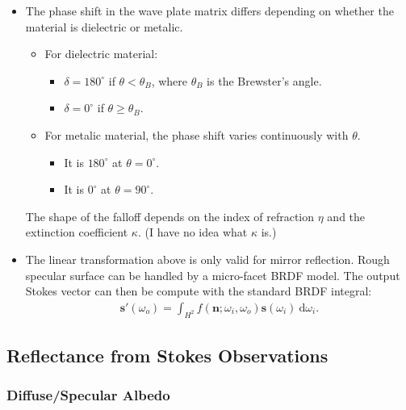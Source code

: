 \documentclass[10pt]{article}
\newcommand{\dee}{\mathrm{d}}
\newcommand{\ve}[1]{\mathbf{#1}}
\begin{document}
\begin{itemize}
        \item The phase shift in the wave plate matrix differs depending on whether the material is dielectric or metalic.
        \begin{itemize}
          \item For dielectric material:
          \begin{itemize}
            \item $\delta = 180^\circ$ if $\theta < \theta_B$, where $\theta_B$ is the Brewster's angle.
            \item $\delta = 0^\circ$ if $\theta \geq \theta_B$.            
          \end{itemize}
          \item For metalic material, the phase shift varies continuously with $\theta$.
          \begin{itemize}
            \item It is $180^\circ$ at $\theta = 0^\circ$.
            \item It is $0^\circ$ at $\theta = 90^\circ$.
          \end{itemize}        
        \end{itemize}
        The shape of the falloff depends on the index of refraction $\eta$ and the extinction coefficient $\kappa$.  (I have no idea what $\kappa$ is.)

        \item The linear transformation above is only valid for mirror reflection.  Rough specular surface can be handled by a micro-facet BRDF model.  The output Stokes vector can then be compute with the standard BRDF integral:
        \begin{align*}
          \ve{s'}(\omega_o) = \int_{H^2} f(\ve{n}; \omega_i, \omega_o) \ve{s}(\omega_i)\ \dee\omega_i.
        \end{align*}
    \end{itemize}

    \subsection{Reflectance from Stokes Observations}

    \subsubsection{Diffuse/Specular Albedo}
    
\end{document}
